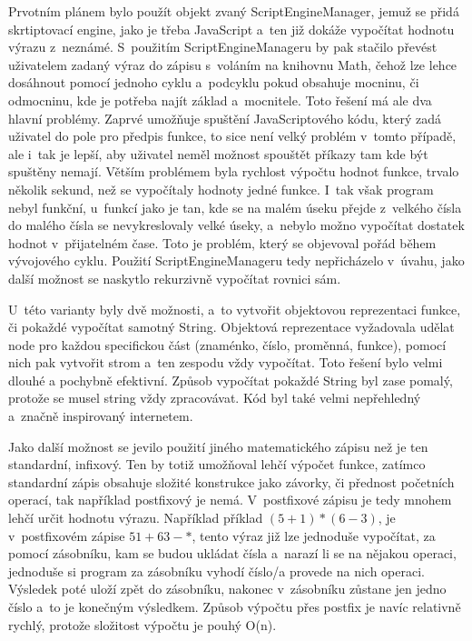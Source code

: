 \documentclass[a4paper,oneside,12p]{report}
\begin{document}
Prvotním plánem bylo použít objekt zvaný ScriptEngineManager, jemuž se přidá skrtiptovací engine, jako je třeba JavaScript a~ten již dokáže vypočítat hodnotu výrazu z~neznámé.
S~použitím ScriptEngineManageru by pak stačilo převést uživatelem zadaný výraz do zápisu s~voláním na knihovnu Math, čehož lze lehce dosáhnout pomocí jednoho cyklu a~podcyklu pokud obsahuje mocninu, či odmocninu, kde je potřeba najít základ a~mocnitele.
Toto řešení má ale dva hlavní problémy.
Zaprvé umožňuje spuštění JavaScriptového kódu, který zadá uživatel do pole pro předpis funkce, to sice není velký problém v~tomto případě, ale i~tak je lepší, aby uživatel neměl možnost spouštět příkazy tam kde být spuštěny nemají.
Větším problémem byla rychlost výpočtu hodnot funkce, trvalo několik sekund, než se vypočítaly hodnoty jedné funkce.
I~tak však program nebyl funkční, u~funkcí jako je tan, kde se na malém úseku přejde z~velkého čísla do malého čísla se nevykreslovaly velké úseky, a~nebylo možno vypočítat dostatek hodnot v~přijatelném čase.
Toto je problém, který se objevoval pořád během vývojového cyklu.
Použití ScriptEngineManageru tedy nepřicházelo v~úvahu, jako další možnost se naskytlo rekurzivně vypočítat rovnici sám.

U~této varianty byly dvě možnosti, a~to vytvořit objektovou reprezentaci funkce, či pokaždé vypočítat samotný String.
Objektová reprezentace vyžadovala udělat node pro každou specifickou část (znaménko, číslo, proměnná, funkce), pomocí nich pak vytvořit strom a~ten zespodu vždy vypočítat.
Toto řešení bylo velmi dlouhé a pochybně efektivní.
Způsob vypočítat pokaždé String byl zase pomalý, protože se musel string vždy zpracovávat.
Kód byl také velmi nepřehledný a~značně inspirovaný internetem.

Jako další možnost se jevilo použití jiného matematického zápisu než je ten standardní, infixový.
Ten by totiž umožňoval lehčí výpočet funkce, zatímco standardní zápis obsahuje složité konstrukce jako závorky, či přednost početních operací, tak například postfixový je nemá.
V~postfixové zápisu je tedy mnohem lehčí určit hodnotu výrazu.
Například příklad $(5+1)*(6-3)$, je v~postfixovém zápise $5 1 + 6 3 - *$, tento výraz již lze jednoduše vypočítat, za pomocí zásobníku, kam se budou ukládat čísla a~narazí li se na nějakou operaci, jednoduše si program za zásobníku vyhodí číslo/a provede na nich operaci.
Výsledek poté uloží zpět do zásobníku, nakonec v~zásobníku zůstane jen jedno číslo a~to je konečným výsledkem.
Způsob výpočtu přes postfix je navíc relativně rychlý, protože složitost výpočtu je pouhý O(n).
\end{document}
